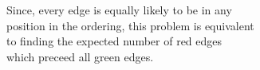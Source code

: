 \documentclass[preview]{standalone}
\begin{document}
\begin{center}
Since, every edge is equally likely to be in any\\ position in the ordering, this problem is equivalent\\ to finding the expected number of red edges\\ which preceed all green edges.
\end{center}
\end{document}
